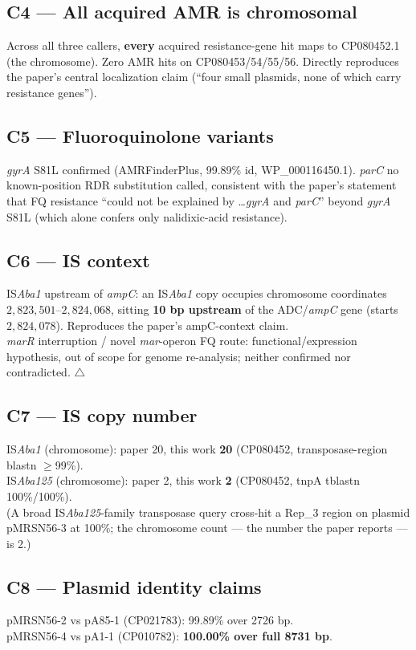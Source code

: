 \documentclass[11pt]{article}
\begin{document}
\subsection{C4 --- All acquired AMR is chromosomal}
Across all three callers, \textbf{every} acquired resistance-gene hit maps to CP080452.1 (the chromosome). Zero AMR hits on CP080453/54/55/56. Directly reproduces the paper's central localization claim (``four small plasmids, none of which carry resistance genes''). \checkmark

\subsection{C5 --- Fluoroquinolone variants}
\emph{gyrA} S81L confirmed (AMRFinderPlus, 99.89\% id, WP\_000116450.1). \emph{parC} no known-position RDR substitution called, consistent with the paper's statement that FQ resistance ``could not be explained by \ldots \emph{gyrA} and \emph{parC}'' beyond \emph{gyrA} S81L (which alone confers only nalidixic-acid resistance). \checkmark

\subsection{C6 --- IS context}
IS\emph{Aba1} upstream of \emph{ampC}: an IS\emph{Aba1} copy occupies chromosome coordinates $2{,}823{,}501$--$2{,}824{,}068$, sitting \textbf{10 bp upstream} of the ADC/\emph{ampC} gene (starts $2{,}824{,}078$). Reproduces the paper's ampC-context claim. \checkmark\\
\emph{marR} interruption / novel \emph{mar}-operon FQ route: functional/expression hypothesis, out of scope for genome re-analysis; neither confirmed nor contradicted. $\triangle$

\subsection{C7 --- IS copy number}
IS\emph{Aba1} (chromosome): paper 20, this work \textbf{20} (CP080452, transposase-region blastn $\geq$99\%). \checkmark\\
IS\emph{Aba125} (chromosome): paper 2, this work \textbf{2} (CP080452, tnpA tblastn 100\%/100\%). \checkmark\\
(A broad IS\emph{Aba125}-family transposase query cross-hit a Rep\_3 region on plasmid pMRSN56-3 at 100\%; the chromosome count --- the number the paper reports --- is 2.)

\subsection{C8 --- Plasmid identity claims}
pMRSN56-2 vs pA85-1 (CP021783): 99.89\% over 2726 bp. \checkmark\\
pMRSN56-4 vs pA1-1 (CP010782): \textbf{100.00\% over full 8731 bp}. \checkmark
\end{document}
